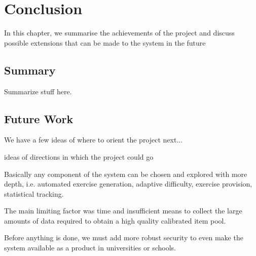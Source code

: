 \chapter{Conclusion}
In this chapter, we summarise the achievements of the project and discuss possible extensions that can be made to the system in the future

\section{Summary}
Summarize stuff here.

\section{Future Work}
\label{sec:future-work}
We have a few ideas of where to orient the project next...\newline

ideas of directions in which the project could go\newline

Basically any component of the system can be chosen and explored with more depth, i.e. automated exercise generation, adaptive difficulty, exercise provision, statistical tracking.

The main limiting factor was time and insufficient means to collect the large amounts of data required to obtain a high quality calibrated item pool.

Before anything is done, we must add more robust security to even make the system available as a product in universities or schools.

